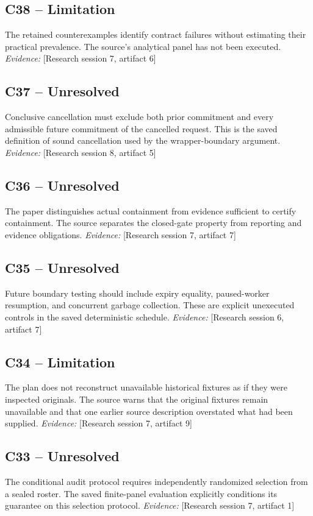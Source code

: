 \documentclass[11pt]{article}
\begin{document}
\begin{sloppypar}
\subsection{C38 -- Limitation}
The retained counterexamples identify contract failures without estimating their practical prevalence.
The source's analytical panel has not been executed.
\textit{Evidence: }[Research session 7, artifact 6]
\subsection{C37 -- Unresolved}
Conclusive cancellation must exclude both prior commitment and every admissible future commitment of the cancelled request.
This is the saved definition of sound cancellation used by the wrapper-boundary argument.
\textit{Evidence: }[Research session 8, artifact 5]
\subsection{C36 -- Unresolved}
The paper distinguishes actual containment from evidence sufficient to certify containment.
The source separates the closed-gate property from reporting and evidence obligations.
\textit{Evidence: }[Research session 7, artifact 7]
\subsection{C35 -- Unresolved}
Future boundary testing should include expiry equality, paused-worker resumption, and concurrent garbage collection.
These are explicit unexecuted controls in the saved deterministic schedule.
\textit{Evidence: }[Research session 6, artifact 7]
\subsection{C34 -- Limitation}
The plan does not reconstruct unavailable historical fixtures as if they were inspected originals.
The source warns that the original fixtures remain unavailable and that one earlier source description overstated what had been supplied.
\textit{Evidence: }[Research session 7, artifact 9]
\subsection{C33 -- Unresolved}
The conditional audit protocol requires independently randomized selection from a sealed roster.
The saved finite-panel evaluation explicitly conditions its guarantee on this selection protocol.
\textit{Evidence: }[Research session 7, artifact 1]

\end{sloppypar}
\end{document}
